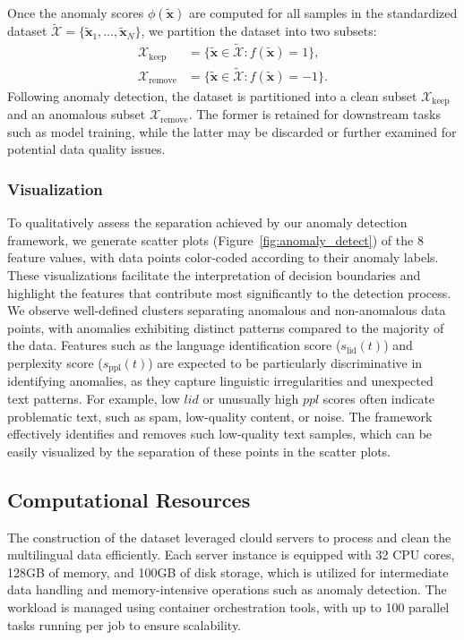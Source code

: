 Once the anomaly scores $\phi(\tilde{\mathbf{x}})$ are computed for all samples in the standardized dataset $\tilde{\mathcal{X}} = \{ \tilde{\mathbf{x}}_1, \ldots, \tilde{\mathbf{x}}_N \}$, we partition the dataset into two subsets:
\begin{align}
\mathcal{X}_{\text{keep}} &= \{ \tilde{\mathbf{x}} \in \tilde{\mathcal{X}} : f(\tilde{\mathbf{x}}) = 1 \}, \\
\mathcal{X}_{\text{remove}} &= \{ \tilde{\mathbf{x}} \in \tilde{\mathcal{X}} : f(\tilde{\mathbf{x}}) = -1 \}.
\end{align}
Following anomaly detection, the dataset is partitioned into a clean subset $\mathcal{X}_{\text{keep}}$ and an anomalous subset $\mathcal{X}_{\text{remove}}$. The former is retained for downstream tasks such as model training, while the latter may be discarded or further examined for potential data quality issues.

\subsubsection{Visualization}
To qualitatively assess the separation achieved by our anomaly detection framework, we generate scatter plots (Figure~\ref{fig:anomaly_detect}) of the $8$ feature values, with data points color-coded according to their anomaly labels.
These visualizations facilitate the interpretation of decision boundaries and highlight the features that contribute most significantly to the detection process.
We observe well-defined clusters separating anomalous and non-anomalous data points, with anomalies exhibiting distinct patterns compared to the majority of the data.
Features such as the language identification score ($s_{\text{lid}}(t)$) and perplexity score ($s_{\text{ppl}}(t)$) are expected to be particularly discriminative in identifying anomalies, as they capture linguistic irregularities and unexpected text patterns. For example, low $lid$ or unusually high $ppl$ scores often indicate problematic text, such as spam, low-quality content, or noise.
The framework effectively identifies and removes such low-quality text samples, which can be easily visualized by the separation of these points in the scatter plots.

\subsection{Computational Resources}
\label{sec:resources}
The construction of the \dcad dataset leveraged clould
servers to process and clean the multilingual data efficiently.
Each server instance is equipped with 32 CPU cores, 128GB of memory, and 100GB of disk storage, which is utilized for intermediate data handling and memory-intensive operations such as anomaly detection.
The workload is managed using container orchestration tools,
with up to 100 parallel tasks running per job to ensure scalability.